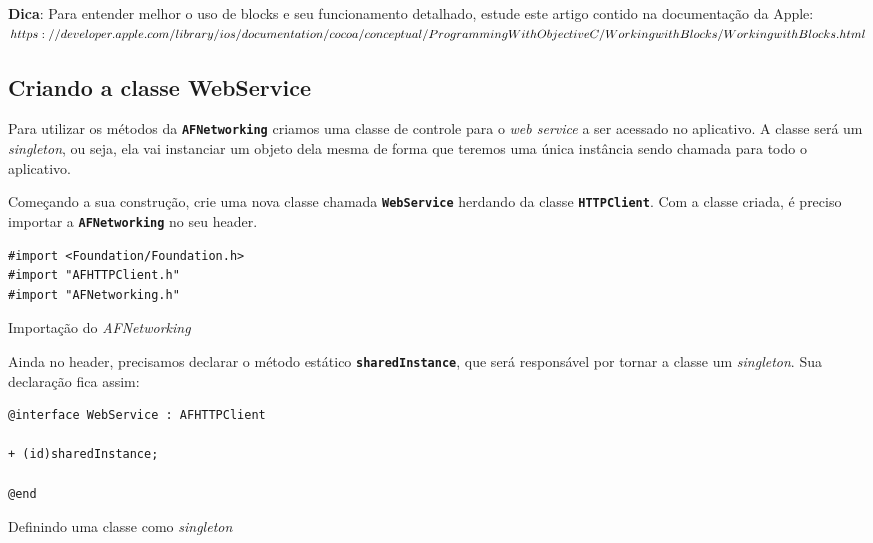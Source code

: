 \documentclass[a4paper,12pt,brazil,doubleside]{book}
\begin{document}
\begin{singlespace}
\bigskip

\begin{framed}

\textbf{Dica}:  Para entender melhor o uso de blocks e seu funcionamento detalhado, estude este artigo contido na documentação da Apple:\\
\(https://developer.apple.com/library/ios/documentation/cocoa/conceptual/\\ProgrammingWithObjectiveC/WorkingwithBlocks/WorkingwithBlocks.html\)
\end{framed}

\subsection{Criando a classe WebService}


Para utilizar os métodos da \texttt{\textbf{AFNetworking}} criamos uma classe de controle para o \emph{web service} a ser acessado no aplicativo. A classe será um \emph{singleton}, ou seja, ela vai instanciar um objeto dela mesma de forma que teremos uma única instância sendo chamada para todo o aplicativo.

Começando a sua construção, crie uma nova classe chamada \texttt{\textbf{WebService}} herdando da classe \texttt{\textbf{HTTPClient}}. Com a classe criada, é preciso importar a \texttt{\textbf{AFNetworking}} no seu header.

\begin{listing}[H]
\begin{verbatim}
#import <Foundation/Foundation.h>
#import "AFHTTPClient.h"
#import "AFNetworking.h"
\end{verbatim}
\caption{Importação do \emph{AFNetworking}}
\end{listing}


Ainda no header, precisamos declarar o método estático \texttt{\textbf{sharedInstance}}, que será responsável por tornar a classe um \emph{singleton}. Sua declaração fica assim:

\begin{listing}[H]
\begin{verbatim}
@interface WebService : AFHTTPClient

+ (id)sharedInstance;

@end
\end{verbatim}
\caption{Definindo uma classe como \emph{singleton}}
\end{listing}



\end{singlespace}
\end{document}

